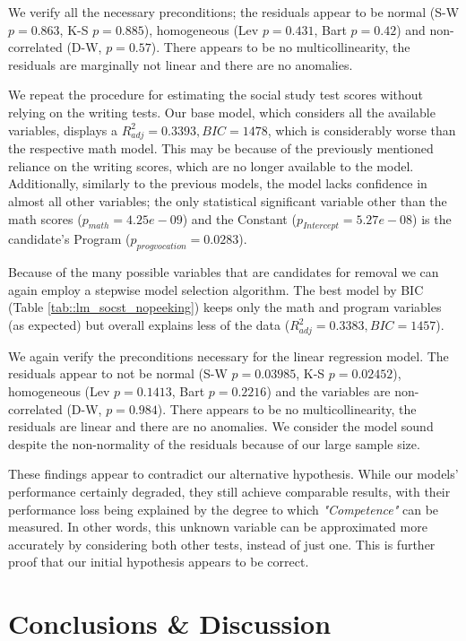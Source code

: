 \documentclass[10pt, a4paper]{article}
\begin{document}
	We verify all the necessary preconditions; the residuals appear to be normal (S-W $p = 0.863$, K-S $p=0.885$), homogeneous (Lev $p = 0.431$, Bart $p = 0.42$) and non-correlated (D-W, $p=0.57$). There appears to be no multicollinearity, the residuals are marginally not linear and there are no anomalies.
	
	We repeat the procedure for estimating the social study test scores without relying on the writing tests. Our base model, which considers all the available variables, displays a $R^2_{adj} = 0.3393, BIC=1478$, which is considerably worse than the respective math model. This may be because of the previously mentioned reliance on the writing scores, which are no longer available to the model. Additionally, similarly to the previous models, the model lacks confidence in almost all other variables; the only statistical significant variable other than the math scores ($p_{math} = 4.25e-09$) and the Constant ($p_{Intercept} = 5.27e-08$) is the candidate's Program ($p_{progvocation} = 0.0283$).
	
	Because of the many possible variables that are candidates for removal we can again employ a stepwise model selection algorithm. The best model by BIC (Table \ref{tab::lm_socst_nopeeking}) keeps only the math and program variables (as expected) but overall explains less of the data ($R^2_{adj} = 0.3383, BIC=1457$).
	
	We again verify the preconditions necessary for the linear regression model. The residuals appear to not be normal (S-W $p = 0.03985$, K-S $p=0.02452$), homogeneous (Lev $p = 0.1413$, Bart $p = 0.2216$) and the variables are non-correlated (D-W, $p=0.984$). There appears to be no multicollinearity, the residuals are linear and there are no anomalies. We consider the model sound  despite the non-normality of the residuals because of our large sample size.
	
	These findings appear to contradict our alternative hypothesis. While our models' performance certainly degraded, they still achieve comparable results, with their performance loss being explained by the degree to which \textit{"Competence"} can be measured. In other words, this unknown variable can be approximated more accurately by considering both other tests, instead of just one. This is further proof that our initial hypothesis appears to be correct.

	\section{Conclusions \& Discussion}
	\label{sec::conclusions}
	
\end{document}
